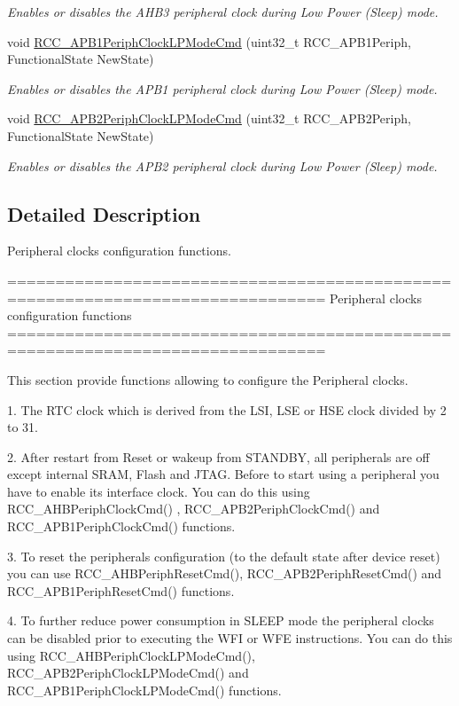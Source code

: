 \begin{DoxyCompactItemize}
\begin{DoxyCompactList}\small\item\em Enables or disables the A\+H\+B3 peripheral clock during Low Power (Sleep) mode. \end{DoxyCompactList}\item 
void \hyperlink{group___r_c_c___group3_ga84dd64badb84768cbcf19e241cadff50}{R\+C\+C\+\_\+\+A\+P\+B1\+Periph\+Clock\+L\+P\+Mode\+Cmd} (uint32\+\_\+t R\+C\+C\+\_\+\+A\+P\+B1\+Periph, Functional\+State New\+State)
\begin{DoxyCompactList}\small\item\em Enables or disables the A\+P\+B1 peripheral clock during Low Power (Sleep) mode. \end{DoxyCompactList}\item 
void \hyperlink{group___r_c_c___group3_ga30365b9e0b4c5d7e98c2675c862ddd7e}{R\+C\+C\+\_\+\+A\+P\+B2\+Periph\+Clock\+L\+P\+Mode\+Cmd} (uint32\+\_\+t R\+C\+C\+\_\+\+A\+P\+B2\+Periph, Functional\+State New\+State)
\begin{DoxyCompactList}\small\item\em Enables or disables the A\+P\+B2 peripheral clock during Low Power (Sleep) mode. \end{DoxyCompactList}\end{DoxyCompactItemize}


\subsection{Detailed Description}
Peripheral clocks configuration functions. 

\begin{DoxyVerb} ===============================================================================
                   Peripheral clocks configuration functions
 ===============================================================================  

  This section provide functions allowing to configure the Peripheral clocks. 
  
  1. The RTC clock which is derived from the LSI, LSE or HSE clock divided by 2 to 31.
     
  2. After restart from Reset or wakeup from STANDBY, all peripherals are off
     except internal SRAM, Flash and JTAG. Before to start using a peripheral you
     have to enable its interface clock. You can do this using RCC_AHBPeriphClockCmd()
     , RCC_APB2PeriphClockCmd() and RCC_APB1PeriphClockCmd() functions.

  3. To reset the peripherals configuration (to the default state after device reset)
     you can use RCC_AHBPeriphResetCmd(), RCC_APB2PeriphResetCmd() and 
     RCC_APB1PeriphResetCmd() functions.
     
  4. To further reduce power consumption in SLEEP mode the peripheral clocks can
     be disabled prior to executing the WFI or WFE instructions. You can do this
     using RCC_AHBPeriphClockLPModeCmd(), RCC_APB2PeriphClockLPModeCmd() and
     RCC_APB1PeriphClockLPModeCmd() functions.  \end{DoxyVerb}
 


